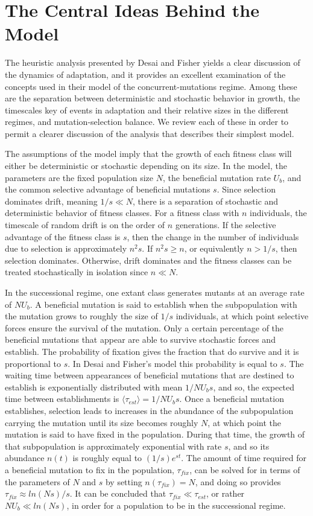 \documentclass[12pt, one column]{article}
\begin{document}
\section*{The Central Ideas Behind the Model}
The heuristic analysis presented by Desai and Fisher yields a clear discussion of the dynamics of adaptation, and it provides an excellent examination of the concepts used in their model of the concurrent-mutations regime.  Among these are the separation between deterministic and stochastic behavior in growth, the timescales key of events in adaptation and their relative sizes in the different regimes, and mutation-selection balance.  We review each of these in order to permit a clearer discussion of the analysis that describes their simplest model.     

The assumptions of the model imply that the growth of each fitness class will either be deterministic or stochastic depending on its size.  In the model, the parameters are the fixed population size $N$, the beneficial mutation rate $U_b$, and the common selective advantage of beneficial mutations $s$.  Since selection dominates drift, meaning $1/s \ll N$, there is a separation of stochastic and deterministic behavior of fitness classes.  For a fitness class with $n$ individuals, the timescale of random drift is on the order of $n$ generations.  If the selective advantage of the fitness class is $s$, then the change in the number of individuals due to selection is approximately $n^2s$.  If $n^2s \ge n$, or equivalently $n>1/s$, then selection dominates.  Otherwise, drift dominates and the fitness classes can be treated stochastically in isolation since $n \ll N$.   

In the successional regime, one extant class generates mutants at an average rate of $N U_b$.  A beneficial mutation is said to establish when the subpopulation with the mutation grows to roughly the size of $1/s$ individuals, at which point selective forces ensure the survival of the mutation.  Only a certain percentage of the beneficial mutations that appear are able to survive stochastic forces and establish.  The probability of fixation gives the fraction that do survive and it is proportional to $s$.  In Desai and Fisher's model this probability is equal to $s$.  The waiting time between appearances of beneficial mutations that are destined to establish is exponentially distributed with mean $1/NU_b s$, and so, the expected time between establishments is $\langle \tau_{est} \rangle = 1/NU_b s$.  Once a beneficial mutation establishes, selection leads to increases in the abundance of the subpopulation carrying the mutation until its size becomes roughly $N$, at which point the mutation is said to have fixed in the population.  During that time, the growth of that subpopulation is approximately exponential with rate $s$, and so its abundance $n(t)$ is roughly equal to $(1/s) e^{st}$.  The amount of time required for a beneficial mutation to fix in the population, $\tau_{fix}$, can be solved for in terms of the parameters of $N$ and $s$ by setting $n(\tau_{fix})=N$, and doing so provides $\tau_{fix} \approx ln(Ns)/s$.  It can be concluded that $\tau_{fix} \ll \tau_{est}$, or rather $N U_b \ll ln(Ns)$, in order for a population to be in the successional regime. 
\end{document}
